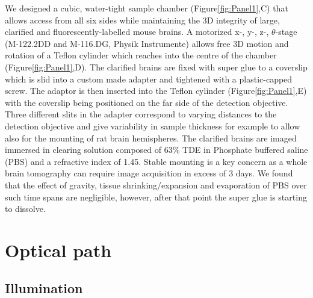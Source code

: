 \documentclass[12pt]{spieman}  %
\begin{document}
We designed a cubic, water-tight sample chamber (Figure\ref{fig:Panel1},C) that allows access from all six sides while maintaining the 3D integrity of large, clarified and fluorescently-labelled mouse brains. A motorized x-, y-, z-, $\theta$-stage (M-122.2DD and M-116.DG, Physik Instrumente) allows free 3D motion and rotation of a Teflon cylinder which reaches into the centre of the chamber (Figure\ref{fig:Panel1},D). The clarified brains are fixed with super glue to a coverslip which is slid into a custom made adapter and tightened with a plastic-capped screw. The adaptor is then inserted into the Teflon cylinder (Figure\ref{fig:Panel1},E) with the coverslip being positioned on the far side of the detection objective. Three different slits in the adapter correspond to varying distances to the detection objective and give variability in sample thickness for example to allow also for the mounting of rat brain hemispheres. The clarified brains are imaged immersed in clearing solution composed of 63\% TDE in Phosphate buffered saline (PBS) and a refractive index of 1.45. Stable mounting is a key concern as a whole brain tomography can require image acquisition in excess of 3 days. We found that the effect of gravity, tissue shrinking/expansion and evaporation of PBS over such time spans are negligible, however, after that point the super glue is starting to dissolve.		
		
	\section{Optical path}

	\subsection{Illumination}
		
\end{document}
